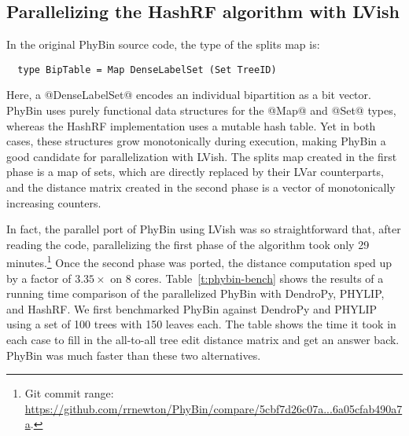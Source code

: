 \subsection{Parallelizing the HashRF algorithm with LVish}

In the original PhyBin source code, the type of the splits map is:

\singlespacing
\begin{lstlisting}
  type BipTable = Map DenseLabelSet (Set TreeID)
\end{lstlisting}
\doublespacing

Here, a @DenseLabelSet@ encodes an individual bipartition as a bit
vector.  PhyBin uses purely functional data structures for the @Map@
and @Set@ types, whereas the HashRF implementation uses a mutable hash
table.  Yet in both cases, these structures grow monotonically during
execution, making PhyBin a good candidate for parallelization with
LVish.  The splits map created in the first phase is a map of sets,
which are directly replaced by their LVar counterparts, and the
distance matrix created in the second phase is a vector of
monotonically increasing counters.  

In fact, the parallel port of PhyBin using LVish was so
straightforward that, after reading the code, parallelizing the first
phase of the algorithm took only 29 minutes.\footnote{Git commit
  range:
  \url{https://github.com/rrnewton/PhyBin/compare/5cbf7d26c07a...6a05cfab490a7a}.}
Once the second phase was ported, the distance computation sped up by
a factor of $3.35\times$ on 8 cores. Table~\ref{t:phybin-bench} shows
the results of a running time comparison of the parallelized PhyBin
with DendroPy, PHYLIP, and HashRF.  We first benchmarked PhyBin
against DendroPy and PHYLIP using a set of 100 trees with 150 leaves
each.  The table shows the time it took in each case to fill in the
all-to-all tree edit distance matrix and get an answer back.  PhyBin
was much faster than these two alternatives.


